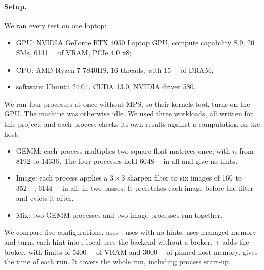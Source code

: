 \paragraph{Setup.} We ran every test on one laptop:

\begin{itemize}
  \item GPU: NVIDIA GeForce RTX 4050 Laptop GPU, compute capability 8.9,
    20 SMs, \SI{6141}{\mebi\byte} of VRAM, PCIe 4.0 x8;
  \item CPU: AMD Ryzen 7 7840HS, 16 threads, with \SI{15}{\giga\byte} of DRAM;
  \item software: Ubuntu 24.04, CUDA 13.0, NVIDIA driver 580.
\end{itemize}

We ran four processes at once without MPS, so their kernels took turns on the
GPU. The machine was otherwise idle. We used three workloads, all written for
this project, and each process checks its own results against a computation
on the host.

\begin{itemize}
  \item GEMM: each process multiplies two square float matrices once, with
    $n$ from 8192 to 14336. The four processes hold \SI{6048}{\mebi\byte} in
    all and give no hints.
  \item Image: each process applies a $3 \times 3$ sharpen filter to six images
    of 160 to \SI{352}{\mebi\byte}, \SI{6144}{\mebi\byte} in all, in two
    passes. It prefetches each image before the filter and evicts it after.
  \item Mix: two GEMM processes and two image processes run together.
\end{itemize}

We compare five configurations.  uses .
 uses  with no hints.  uses
managed memory and turns each hint into .
 local uses the  backend without a broker.  +
\vmemd adds the broker, with limits of \SI{5400}{\mebi\byte} of VRAM and
\SI{3000}{\mebi\byte} of pinned host memory.  gives the
time of each run. It covers the whole run, including process start-up.

